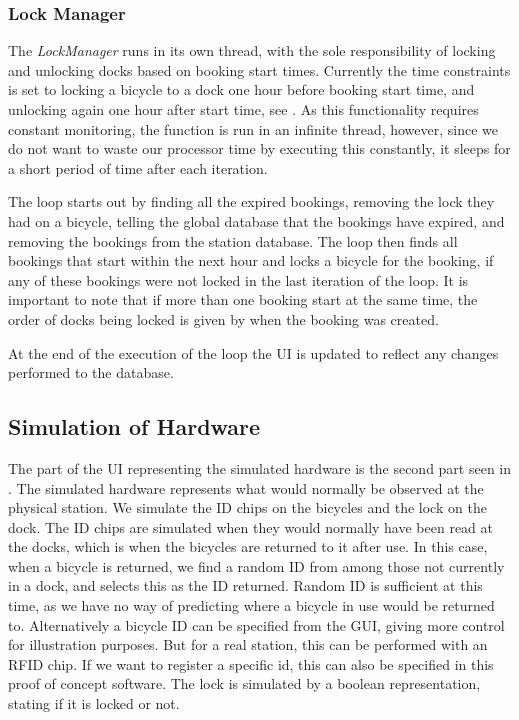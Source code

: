 \subsubsection{Lock Manager}
The \textit{LockManager} runs in its own thread, with the sole responsibility of locking and unlocking docks based on booking start times. 
Currently the time constraints is set to locking a bicycle to a dock one hour before booking start time, and unlocking again one hour after start time, see . 
As this functionality requires constant monitoring, the function is run in an infinite thread, however, since we do not want to waste our processor time by executing this constantly, it sleeps for a short period of time after each iteration.

The loop starts out by finding all the expired bookings, removing the lock they had on a bicycle, telling the global database that the bookings have expired, and removing the bookings from the station database.
The loop then finds all bookings that start within the next hour and locks a bicycle for the booking, if any of these bookings were not locked in the last iteration of the loop. 
It is important to note that if more than one booking start at the same time, the order of docks being locked is given by when the booking was created. 

At the end of the execution of the loop the UI is updated to reflect any changes performed to the database.

\subsection{Simulation of Hardware}
The part of the UI representing the simulated hardware is the second part seen in .
The simulated hardware represents what would normally be observed at the physical station.
We simulate the ID chips on the bicycles and the lock on the dock.
The ID chips are simulated when they would normally have been read at the docks, which is when the bicycles are returned to it after use.
In this case, when a bicycle is returned, we find a random ID from among those not currently in a dock, and selects this as the ID returned.
Random ID is sufficient at this time, as we have no way of predicting where a bicycle in use would be returned to.
Alternatively a bicycle ID can be specified from the GUI, giving more control for illustration purposes.
But for a real station, this can be performed with an RFID chip.
If we want to register a specific id, this can also be specified in this proof of concept software.
The lock is simulated by a boolean representation, stating if it is locked or not.

